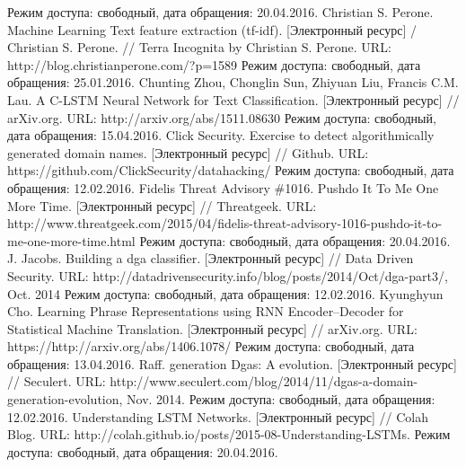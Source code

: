 \begin{thebibliography}{00}
    Режим доступа: свободный, дата обращения: 20.04.2016.
    Christian S. Perone. Machine Learning Text feature extraction (tf-idf). [Электронный ресурс] / Christian S. Perone. // Terra Incognita by Christian S. Perone.
    URL: http://blog.christianperone.com/?p=1589
    Режим доступа: свободный, дата обращения: 25.01.2016.
    Chunting Zhou, Chonglin Sun, Zhiyuan Liu, Francis C.M. Lau.
    A C-LSTM Neural Network for Text Classification. [Электронный ресурс] // arXiv.org.
    URL: http://arxiv.org/abs/1511.08630
    Режим доступа: свободный, дата обращения: 15.04.2016.
    Click Security. Exercise to detect algorithmically generated domain names.
    [Электронный ресурс] // Github.
    URL: https://github.com/ClickSecurity/datahacking/
    Режим доступа: свободный, дата обращения: 12.02.2016.
    Fidelis Threat Advisory \#1016. Pushdo It To Me One More Time.
    [Электронный ресурс] // Threatgeek.
    URL: http://www.threatgeek.com/2015/04/fidelis-threat-advisory-1016-pushdo-it-to-me-one-more-time.html
    Режим доступа: свободный, дата обращения: 20.04.2016.
    J. Jacobs. Building a dga classifier.
    [Электронный ресурс] // Data Driven Security.
    URL: http://datadrivensecurity.info/blog/posts/2014/Oct/dga-part3/, Oct. 2014
    Режим доступа: свободный, дата обращения: 12.02.2016.
    Kyunghyun Cho.
    Learning Phrase Representations using RNN Encoder–Decoder for Statistical Machine Translation. [Электронный ресурс] // arXiv.org.
    URL: https://http://arxiv.org/abs/1406.1078/
    Режим доступа: свободный, дата обращения: 13.04.2016.
    Raff. generation Dgas: A evolution.
    [Электронный ресурс] // Seculert.
    URL: http://www.seculert.com/blog/2014/11/dgas-a-domain-generation-evolution, Nov. 2014.
    Режим доступа: свободный, дата обращения: 12.02.2016.
    Understanding LSTM Networks. [Электронный ресурс] // Colah Blog.
    URL: http://colah.github.io/posts/2015-08-Understanding-LSTMs.
    Режим доступа: свободный, дата обращения: 20.04.2016.
\end{thebibliography}
\endgroup

\clearpage

